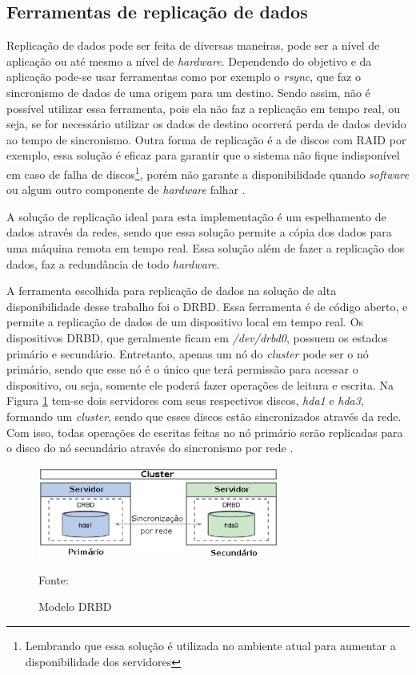 \subsection{Ferramentas de replicação de dados}
\label{section:toolrepl}

Replicação de dados pode ser feita de diversas maneiras, pode ser a nível de aplicação ou até mesmo a nível de \textit{hardware}.
Dependendo do objetivo e da aplicação pode-se usar ferramentas como por exemplo o \textit{rsync}, que faz o sincronismo de dados de uma origem
para um destino. Sendo assim, não é possível utilizar essa ferramenta, pois ela não faz a replicação em tempo real, ou seja, se for necessário
utilizar os dados de destino ocorrerá perda de dados devido ao tempo de sincronismo. Outra forma de replicação é a de discos com \ac{RAID} 
por exemplo, essa solução é eficaz para garantir que o sistema não fique indisponível em caso de falha de discos\footnote{Lembrando que essa 
solução é utilizada no ambiente atual para aumentar a disponibilidade dos servidores}, porém não garante a disponibilidade quando \textit{software}
ou algum outro componente de \textit{hardware} falhar \cite{zaminhani2008}.

A solução de replicação ideal para esta implementação é um espelhamento de dados através da redes, sendo que essa solução permite a cópia dos 
dados para uma máquina remota em tempo real. Essa solução além de fazer a replicação dos dados, faz a redundância de todo \textit{hardware}.

A ferramenta escolhida para replicação de dados na solução de alta disponibilidade desse trabalho foi o \ac{DRBD}. Essa ferramenta é de código
aberto, e permite a replicação de dados de um dispositivo local em tempo real. Os dispositivos \ac{DRBD}, que geralmente ficam em 
\textit{/dev/drbd0}, possuem os estados primário e secundário. Entretanto, apenas um nó do \textit{cluster} pode ser o nó primário, sendo que
esse nó é o único que terá permissão para acessar o dispositivo, ou seja, somente ele poderá fazer operações de leitura e escrita.
Na Figura \ref{fig:drbd_basic} tem-se dois servidores com seus respectivos discos, \textit{hda1} e \textit{hda3}, formando um \textit{cluster}, 
sendo que esses discos estão sincronizados através da rede. Com isso, todas operações de escritas feitas no nó primário serão replicadas para 
o disco do nó secundário através do sincronismo por rede \cite{zaminhani2008}.

\begin{figure}[h!]
 \centering
 \includegraphics[width=300px]{img/drbd_basic.eps}
 \caption{Modelo DRBD}
 Fonte: \citet{jones2010}
 \label{fig:drbd_basic}
\end{figure}

